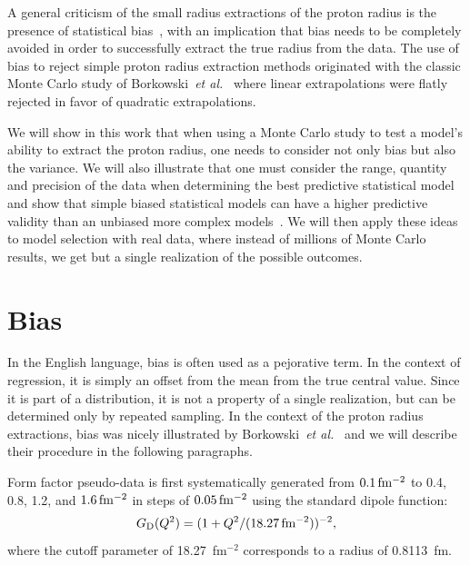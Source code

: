 \documentclass[10pt,superscriptaddress,aps,prc,twocolumn]{revtex4-1}
\begin{document}
A general criticism of the small radius extractions of the proton radius is 
the presence of statistical bias~\cite{Sick:2017aor,Sick:2018fzn},
with an implication that bias needs to be completely avoided in order to 
successfully extract the true radius from the data.
The use of bias to reject simple proton radius extraction methods
originated with the classic Monte Carlo study of Borkowski~{\it{et al.}}~\cite{Borkowski:1975ume} 
where linear extrapolations were flatly rejected in favor of quadratic
extrapolations.  

We will show in this work that when using a Monte Carlo study to test a model's ability
to extract the proton radius, one needs to consider not only bias but also the variance.  
We will also illustrate that one must consider 
the range, quantity and precision of the data
when determining the best predictive statistical model
and show that simple biased statistical models can have a higher predictive 
validity than an unbiased more complex models~\cite{Shmueli:2010}.   We will then 
apply these ideas to model selection with real
data, where instead of millions of Monte Carlo results, we get but a single realization of the possible outcomes.  

\section{Bias}

In the English language, bias is often used as a pejorative term. 
In the context of regression, it is simply an offset from the mean from the true central value.
Since it is part of a distribution, it
is not a property of a single realization, but can be determined only by repeated sampling.    In the context of the proton 
radius extractions, bias was nicely illustrated by Borkowski~{\it{et al.}}~\cite{Borkowski:1975ume} and we will
describe their procedure in the following paragraphs.

Form factor pseudo-data is first systematically generated 
from $\unit[0.1]{fm^{-2}}$ to 0.4, 0.8, 1.2,
and $\unit[1.6]{fm^{-2}}$ 
in steps of $\unit[0.05]{fm^{-2}}$ 
using the standard dipole function:
\begin{equation}
\label{sd}
G\mathrm{_D}(Q^2) = ( 1 + Q^2/(\unit[18.27]{fm^{-2}}))^{-2},
\end{equation}
where the cutoff parameter of 18.27~fm$^{-2}$ corresponds to a radius of 0.8113~fm.
\end{document}

